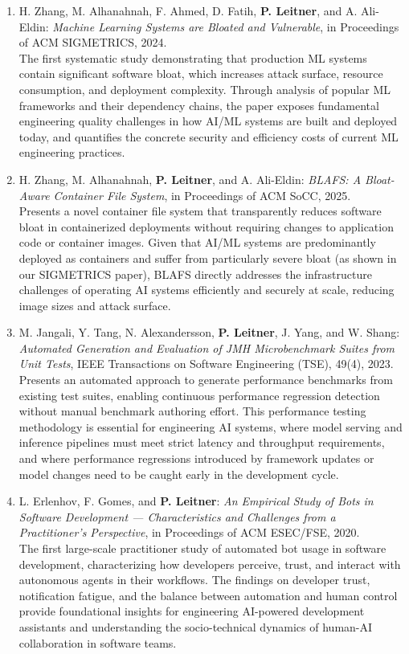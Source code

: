 \documentclass[a4paper,11pt]{article}
\begin{document}
\begin{enumerate}[leftmargin=2em,itemsep=0.7em]
\item H. Zhang, M. Alhanahnah, F. Ahmed, D. Fatih, \textbf{P. Leitner}, and A. Ali-Eldin: \emph{Machine Learning Systems are Bloated and Vulnerable}, in Proceedings of ACM SIGMETRICS, 2024.\\
{\small The first systematic study demonstrating that production ML systems contain significant software bloat, which increases attack surface, resource consumption, and deployment complexity. Through analysis of popular ML frameworks and their dependency chains, the paper exposes fundamental engineering quality challenges in how AI/ML systems are built and deployed today, and quantifies the concrete security and efficiency costs of current ML engineering practices.}

\item H. Zhang, M. Alhanahnah, \textbf{P. Leitner}, and A. Ali-Eldin: \emph{BLAFS: A Bloat-Aware Container File System}, in Proceedings of ACM SoCC, 2025.\\
{\small Presents a novel container file system that transparently reduces software bloat in containerized deployments without requiring changes to application code or container images. Given that AI/ML systems are predominantly deployed as containers and suffer from particularly severe bloat (as shown in our SIGMETRICS paper), BLAFS directly addresses the infrastructure challenges of operating AI systems efficiently and securely at scale, reducing image sizes and attack surface.}

\item M. Jangali, Y. Tang, N. Alexandersson, \textbf{P. Leitner}, J. Yang, and W. Shang: \emph{Automated Generation and Evaluation of JMH Microbenchmark Suites from Unit Tests}, IEEE Transactions on Software Engineering (TSE), 49(4), 2023.\\
{\small Presents an automated approach to generate performance benchmarks from existing test suites, enabling continuous performance regression detection without manual benchmark authoring effort. This performance testing methodology is essential for engineering AI systems, where model serving and inference pipelines must meet strict latency and throughput requirements, and where performance regressions introduced by framework updates or model changes need to be caught early in the development cycle.}

\item L. Erlenhov, F. Gomes, and \textbf{P. Leitner}: \emph{An Empirical Study of Bots in Software Development --- Characteristics and Challenges from a Practitioner's Perspective}, in Proceedings of ACM ESEC/FSE, 2020.\\
{\small The first large-scale practitioner study of automated bot usage in software development, characterizing how developers perceive, trust, and interact with autonomous agents in their workflows. The findings on developer trust, notification fatigue, and the balance between automation and human control provide foundational insights for engineering AI-powered development assistants and understanding the socio-technical dynamics of human-AI collaboration in software teams.}


\end{enumerate}
\end{document}

